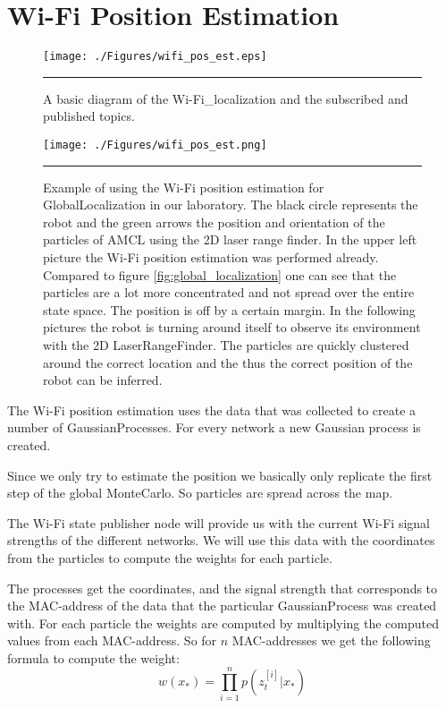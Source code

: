 \section{Wi-Fi Position Estimation}\label{sec:wifiposest}
\begin{figure}[htbp]
	\centering
		\texttt{[image: ./Figures/wifi\_pos\_est.eps]}
		\rule{35em}{0.5pt}
	\caption[Diagram of the Wi-Fi\_localization]{A basic diagram of the Wi-Fi\_localization and the subscribed and published topics.}
	\label{fig:ros_localization}
\end{figure}
\begin{figure}[htbp]
	\centering
		\texttt{[image: ./Figures/wifi\_pos\_est.png]}
		\rule{35em}{0.5pt}
	\caption[Wi-Fi position estimation example]{Example of using the Wi-Fi position estimation for \gls{GlobalLocalization} in our laboratory. The black circle represents the robot and the green arrows the position and orientation of the particles of AMCL using the 2D laser range finder. In the upper left picture the Wi-Fi position estimation was performed already. Compared to figure \ref{fig:global_localization} one can see that the particles are a lot more concentrated and not spread over the entire state space. The position is off by a certain margin. In the following pictures the robot is turning around itself to observe its environment with the 2D \gls{LaserRangeFinder}. The particles are quickly clustered around the correct location and the thus the correct position of the robot can be inferred.}
	\label{fig:wifi_pos_est_example}
\end{figure}
The Wi-Fi position estimation uses the data that was collected to create a number of \Gls{GaussianProcess}es. For every network a new Gaussian process is created.

Since we only try to estimate the position we basically only replicate the first step of the global \Gls{MonteCarlo}. So particles are spread across the map. 

The Wi-Fi state publisher node will provide us with the current Wi-Fi signal strengths of the different networks. We will use this data with the coordinates from the particles to compute the weights for each particle. 

The processes get the coordinates, and the signal strength that corresponds to the \Gls{MAC-address} of the data that the particular \Gls{GaussianProcess} was created with. For each particle the weights are computed by multiplying the computed values from each \Gls{MAC-address}. So for $n$ \Gls{MAC-address}es we get the following formula to compute the weight:
\begin{equation}
w(x_*) = \prod_{i=1}^np(z_{t}^{[i]}|x_*)
\end{equation} 

